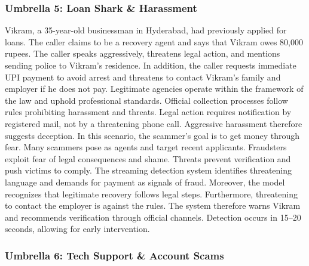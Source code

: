 \documentclass{article}
\begin{document}
\subsubsection{Umbrella 5: Loan Shark \& Harassment}
\label{app:casestudy:loan}

Vikram, a 35-year-old businessman in Hyderabad, had previously applied for loans. The caller claims to be a recovery agent and says that Vikram owes 80,000 rupees. The caller speaks aggressively, threatens legal action, and mentions sending police to Vikram's residence. In addition, the caller requests immediate UPI payment to avoid arrest and threatens to contact Vikram's family and employer if he does not pay. Legitimate agencies operate within the framework of the law and uphold professional standards. Official collection processes follow rules prohibiting harassment and threats. Legal action requires notification by registered mail, not by a threatening phone call. Aggressive harassment therefore suggests deception. In this scenario, the scammer's goal is to get money through fear. Many scammers pose as agents and target recent applicants. Fraudsters exploit fear of legal consequences and shame. Threats prevent verification and push victims to comply. The streaming detection system identifies threatening language and demands for payment as signals of fraud. Moreover, the model recognizes that legitimate recovery follows legal steps. Furthermore, threatening to contact the employer is against the rules. The system therefore warns Vikram and recommends verification through official channels. Detection occurs in 15--20 seconds, allowing for early intervention.

\subsubsection{Umbrella 6: Tech Support \& Account Scams}
\label{app:casestudy:tech}
\end{document}
